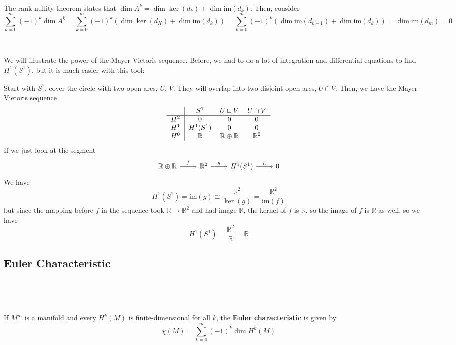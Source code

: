 \documentclass{article}
\begin{document}
\begin{customproof}
\

The rank nullity theorem states that $\dim A^k = \dim \ker(d_k) + \dim \text{im}(d_k)$. Then, consider $$\sum_{k=0}^m (-1)^k \dim A^k = \sum_{k=0}^m (-1)^k (\dim \ker(d_K) + \dim \text{im}(d_k)) = \sum_{k=0}^m (-1)^k (\dim \text{im}(d_{k-1}) + \dim \text{im}(d_k)) = \dim \text{im}(d_m) = 0$$
\end{customproof}

\begin{example}
\

We will illustrate the power of the Mayer-Vietoris sequence. Before, we had to do a lot of integration and differential equations to find $H^1(S^1)$, but it is much easier with this tool:

Start with $S^1$, cover the circle with two open arcs, $U$, $V$. They will overlap into two disjoint open arcs, $U \cap V$. Then, we have the Mayer-Vietoris sequence \[\begin{tabular}{c | c c c}
  & $S^1$ & $U \sqcup V$ & $U \cap V$\\
  \hline
  $H^2$ & $0$ & $0$ & $0$\\
  $H^1$ & $H^1(S^1)$ & $0$ & $0$\\
  $H^0$ & $\mathbb{R}$ & $\mathbb{R} \oplus \mathbb{R}$ & $\mathbb{R}^2$
\end{tabular}\]If we just look at the segment \[\begin{tikzcd}
  \mathbb{R} \oplus \mathbb{R} & \mathbb{R}^2 & H^1(S^1) & 0
  \arrow[from=1-1, to=1-2, "f"]
  \arrow[from=1-2, to=1-3, "g"]
  \arrow[from=1-3, to=1-4, "h"]
\end{tikzcd}\]We have $$H^1(S^1) = \text{im}(g) \cong \frac{\mathbb{R}^2}{\ker(g)} = \frac{\mathbb{R}^2}{\text{im}(f)}$$but since the mapping before $f$ in the sequence took $\mathbb{R} \to \mathbb{R}^2$ and had image $\mathbb{R}$, the kernel of $f$ is $\mathbb{R}$, so the image of $f$ is $\mathbb{R}$ as well, so we have $$H^1(S^1) = \frac{\mathbb{R}^2}{\mathbb{R}} = \mathbb{R}$$
\end{example}

\subsection{Euler Characteristic}
\

\begin{definition}
\

If $M^m$ is a manifold and every $H^k(M)$ is finite-dimensional for all $k$, the \textbf{Euler characteristic} is given by $$\chi(M) = \sum_{k=0}^m (-1)^k \dim H^k(M)$$
\end{definition}
\end{document}
